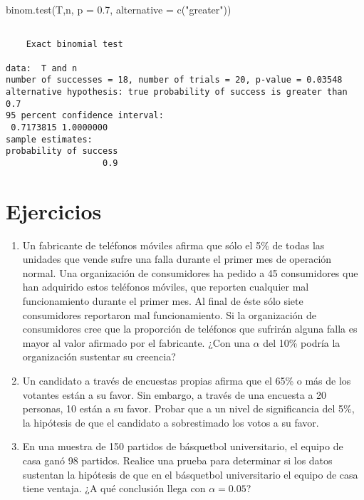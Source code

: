 \documentclass[
  a4paper,
  oneside,
  openany]{book}
\newenvironment{Shaded}{\begin{snugshade}}{\end{snugshade}}
\newcommand{\AttributeTok}[1]{\textcolor[rgb]{0.77,0.63,0.00}{#1}}
\newcommand{\FloatTok}[1]{\textcolor[rgb]{0.00,0.00,0.81}{#1}}
\newcommand{\FunctionTok}[1]{\textcolor[rgb]{0.00,0.00,0.00}{#1}}
\newcommand{\NormalTok}[1]{#1}
\newcommand{\StringTok}[1]{\textcolor[rgb]{0.31,0.60,0.02}{#1}}
\begin{document}
\begin{Shaded}
\begin{Highlighting}[]
\FunctionTok{binom.test}\NormalTok{(T,n, }\AttributeTok{p =} \FloatTok{0.7}\NormalTok{, }\AttributeTok{alternative =} \FunctionTok{c}\NormalTok{(}\StringTok{"greater"}\NormalTok{))}
\end{Highlighting}
\end{Shaded}

\begin{verbatim}

    Exact binomial test

data:  T and n
number of successes = 18, number of trials = 20, p-value = 0.03548
alternative hypothesis: true probability of success is greater than 0.7
95 percent confidence interval:
 0.7173815 1.0000000
sample estimates:
probability of success 
                   0.9 
\end{verbatim}

\hypertarget{ejercicios}{%
\section{Ejercicios}\label{ejercicios}}

\begin{enumerate}
\def\labelenumi{\arabic{enumi}.}
\item
  Un fabricante de teléfonos móviles afirma que sólo el 5\% de todas las unidades que vende sufre una falla durante el primer mes de operación normal. Una organización de consumidores ha pedido a 45 consumidores que han adquirido estos teléfonos móviles, que reporten cualquier mal funcionamiento durante el primer mes. Al final de éste sólo siete consumidores reportaron mal funcionamiento. Si la organización de consumidores cree que la proporción de teléfonos que sufrirán alguna falla es mayor al valor afirmado por el fabricante. ¿Con una \(\alpha\) del 10\% podría la organización sustentar su creencia?
\item
  Un candidato a través de encuestas propias afirma que el 65\% o más de los votantes están a su favor. Sin embargo, a través de una encuesta a 20 personas, 10 están a su favor. Probar que a un nivel de significancia del 5\%, la hipótesis de que el candidato a sobrestimado los votos a su favor.
\item
  En una muestra de 150 partidos de básquetbol universitario, el equipo de casa ganó 98 partidos. Realice una prueba para determinar si los datos sustentan la hipótesis de que en el básquetbol universitario el equipo de casa tiene ventaja. ¿A qué conclusión llega con \(\alpha= 0.05\)?
\end{enumerate}
\end{document}

